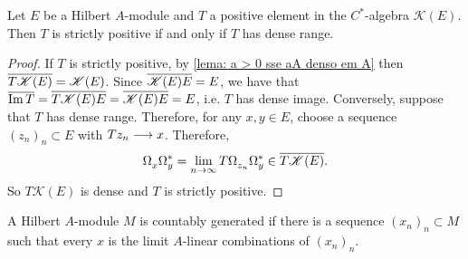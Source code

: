\begin{proposicao}
\label{prop: T > 0 sse Im T densa}
Let $E$ be a Hilbert $A$-module and $T$ a positive element in the $C^*$-algebra $\mathscr K(E)$. Then $T$ is strictly positive if and only if $T$ has dense range.
\begin{proof}
If $T$ is strictly positive, by \ref{lema: a > 0 sse aA denso em A} then $\overline{T\mathscr K(E)} = \mathscr K(E)$. Since $\overline{\mathscr K(E)E} = E$, we have that $\overline{\operatorname{Im} T} = \overline{T\mathscr K(E)E} = \overline{\mathscr K(E)E} = E$, i.e. $T$ has dense image. Conversely, suppose that $T$ has dense range. Therefore, for any $x,y \in E$, choose a sequence $(z_n)_n\subset E$ with $Tz_n \longrightarrow x$. Therefore,
\[
\Omega_x^{\vphantom{*}}\Omega_y^* = \lim_{n\to \infty} T\Omega_{z_n}^{\vphantom{*}}\Omega_y^* \in \overline{T\mathscr K(E)}.
\]
So $T\mathscr K(E)$ is dense and $T$ is strictly positive.
\end{proof}
\end{proposicao}

A Hilbert $A$-module $M$ is countably generated if there is a sequence $\left(x_{n}\right)_n \subset M$ such that every $x$ is the limit $A$-linear combinations of $\left(x_{n}\right)_n$.

